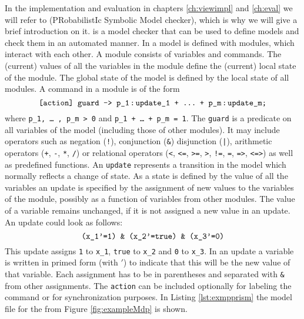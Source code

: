 \documentclass[preview]{standalone}
\begin{document}
In the implementation and evaluation in chapters \ref{ch:viewimpl} and \ref{ch:eval} we will refer to \prism (PRobabilistIc Symbolic Model checker), which is why we will give a brief introduction on it. \prism is a model checker that can be used to define models and check them in an automated manner. In \prism a model is defined with modules, which interact with each other. A module consists of variables and commands. The (current) values of all the variables in the module define the (current) local state of the module. The global state of the model is defined by the local state of all modules.
A command in a module is of the form 
\[
\text{\texttt{[action] guard -> p\_1\!\;:\!\;update\_1\space+\space\dots\;\,+\space p\_m\!\;:\!\;update\_m;}} 
\]
where \texttt{p\_1, \dots\;\,, p\_m > 0} and \texttt{p\_1 + \dots\;\,+ p\_m = 1}.
The \texttt{guard} is a predicate on all variables of the model (including those of other modules). It may include operators such as negation (\texttt{!}), conjunction (\texttt{\&}) disjunction (\texttt{|}), arithmetic operators (\texttt{+}, \texttt{-}, \texttt{*}, \texttt{/}) or relational operators (\texttt{<}, \texttt{<=}, \texttt{>=}, \texttt{>}, \texttt{!=}, \texttt{=}, \texttt{=>}, \texttt{<=>}) as well as predefined functions.
An \texttt{update} represents a transition in the model which normally reflects a change of state. As a state is defined by the value of all the variables an update is specified by the assignment of new values to the variables of the module, possibly as a function of variables from other modules. The value of a variable remains unchanged, if it is not assigned a new value in an update. An update could look as follows:
\[
\text{\texttt{(x\_1'=1) \& (x\_2'=true) \& (x\_3'=0)}}
\]
This update assigns \texttt{1} to \texttt{x\_1}, \texttt{true} to \texttt{x\_2} and \texttt{0} to \texttt{x\_3}. In an update a variable is written in primed form (with $'$) to indicate that this will be the new value of that variable. Each assignment has to be in parentheses and separated with \texttt{\&} from other assignments.
The \texttt{action} can be included optionally for labeling the command or for synchronization purposes. In Listing \ref{lst:exmpprism} the model file for the \mdpN \mdp from Figure \ref{fig:exampleMdp} is shown. 
\end{document}
